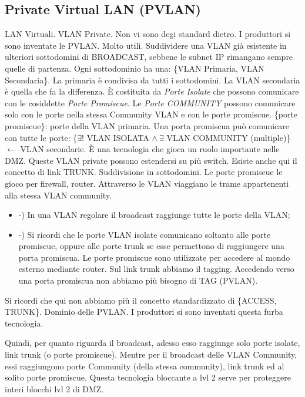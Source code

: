 \subsection{Private Virtual LAN (PVLAN)}

LAN Virtuali. VLAN Private. Non vi sono degi standard dietro. I produttori si sono inventate le PVLAN. Molto utili. Suddividere una VLAN già esistente in ulteriori sottodomini di BROADCAST, sebbene le subnet IP rimangano sempre quelle di partenza. Ogni sottodominio ha una: \{VLAN Primaria, VLAN Secondaria\}. La primaria è condivisa da tutti i sottodomini. La VLAN secondaria è quella che fa la differenza. \`E costituita da \textit{Porte Isolate} che possono comunicare con le cosiddette \textit{Porte Promiscue}. Le \textit{Porte COMMUNITY} possono comunicare solo con le porte nella stessa Community VLAN e con le porte promiscue. \{porte promiscue\}: porte della VLAN primaria. Una porta promiscua può comunicare con tutte le porte: \{$\exists!$ VLAN ISOLATA $\land\ \exists$ VLAN COMMUNITY (multiple)\} $\leftarrow$ VLAN secondarie. \`E una tecnologia che gioca un ruolo importante nelle DMZ. Queste VLAN private possono estendersi su più switch. Esiste anche qui il concetto di link TRUNK. Suddivisione in sottodomini. Le porte promiscue le gioco per firewall, router. Attraverso le VLAN viaggiano le trame appartenenti alla stessa VLAN community.

\begin{itemize}

\item{-)} In una VLAN regolare il broadcast raggiunge tutte le porte della VLAN;
\item{-)} Si ricordi che le porte VLAN isolate comunicano soltanto alle porte promiscue, oppure alle porte trunk se esse permettono di raggiungere una porta promiscua. Le porte promiscue sono utilizzate per accedere al mondo esterno mediante router. Sul link trunk abbiamo il tagging. Accedendo verso una porta promiscua non abbiamo più bisogno di TAG (PVLAN).

\end{itemize}

Si ricordi che qui non abbiamo più il concetto standardizzato di \{ACCESS, TRUNK\}. Dominio delle PVLAN. I produttori si sono inventati questa furba tecnologia.

Quindi, per quanto riguarda il broadcast, adesso esso raggiunge solo porte isolate, link trunk (o porte promiscue). Mentre per il broadcast delle VLAN Community, essi raggiungono porte Community (della stessa community), link trunk ed al solito porte promiscue. Questa tecnologia bloccante a lvl 2 serve per proteggere interi blocchi lvl 2 di DMZ.

